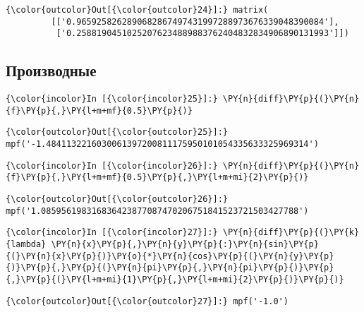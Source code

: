             \begin{Verbatim}[commandchars=\\\{\}]
{\color{outcolor}Out[{\color{outcolor}24}]:} matrix(
         [['0.9659258262890682867497431997288973676339048390084'],
          ['0.25881904510252076234889883762404832834906890131993']])
\end{Verbatim}
        
\subsection{Производные}
\label{mpmath4}

    \begin{Verbatim}[commandchars=\\\{\}]
{\color{incolor}In [{\color{incolor}25}]:} \PY{n}{diff}\PY{p}{(}\PY{n}{f}\PY{p}{,}\PY{l+m+mf}{0.5}\PY{p}{)}
\end{Verbatim}

            \begin{Verbatim}[commandchars=\\\{\}]
{\color{outcolor}Out[{\color{outcolor}25}]:} mpf('-1.4841132216030061397200811175950101054335633325969314')
\end{Verbatim}
        
    \begin{Verbatim}[commandchars=\\\{\}]
{\color{incolor}In [{\color{incolor}26}]:} \PY{n}{diff}\PY{p}{(}\PY{n}{f}\PY{p}{,}\PY{l+m+mf}{0.5}\PY{p}{,}\PY{l+m+mi}{2}\PY{p}{)}
\end{Verbatim}

            \begin{Verbatim}[commandchars=\\\{\}]
{\color{outcolor}Out[{\color{outcolor}26}]:} mpf('1.085956198316836423877087470206751841523721503427788')
\end{Verbatim}
        
    \begin{Verbatim}[commandchars=\\\{\}]
{\color{incolor}In [{\color{incolor}27}]:} \PY{n}{diff}\PY{p}{(}\PY{k}{lambda} \PY{n}{x}\PY{p}{,}\PY{n}{y}\PY{p}{:}\PY{n}{sin}\PY{p}{(}\PY{n}{x}\PY{p}{)}\PY{o}{*}\PY{n}{cos}\PY{p}{(}\PY{n}{y}\PY{p}{)}\PY{p}{,}\PY{p}{(}\PY{n}{pi}\PY{p}{,}\PY{n}{pi}\PY{p}{)}\PY{p}{,}\PY{p}{(}\PY{l+m+mi}{1}\PY{p}{,}\PY{l+m+mi}{2}\PY{p}{)}\PY{p}{)}
\end{Verbatim}

            \begin{Verbatim}[commandchars=\\\{\}]
{\color{outcolor}Out[{\color{outcolor}27}]:} mpf('-1.0')
\end{Verbatim}
        
